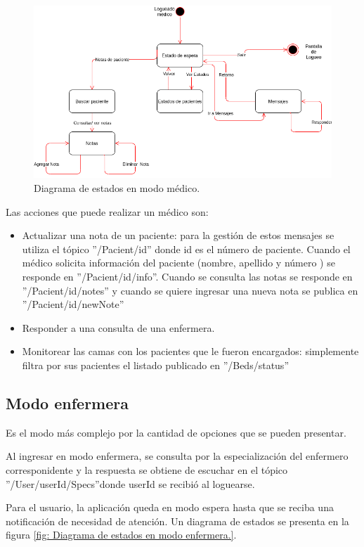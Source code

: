 \begin{figure}[ht]
	\centering
	\includegraphics[scale=.60]{./Figures/app/modo-medico.png}
	\caption{ Diagrama de estados en modo médico.}
	\label{fig: Diagrama de estados en modo médico.}
\end{figure} 

Las acciones que puede realizar un médico son:
\begin{itemize}
\item Actualizar una nota de un paciente: para la gestión de estos mensajes se utiliza el tópico ''/Pacient/id'' donde id es el número de paciente. Cuando el médico solicita información del paciente (nombre, apellido y número ) se responde  en ''/Pacient/id/info''. Cuando se consulta las notas se responde en ''/Pacient/id/notes'' y cuando se quiere ingresar una nueva nota se publica en ''/Pacient/id/newNote''
\item Responder a una consulta de una enfermera.
\item Monitorear las camas con los pacientes que le fueron encargados: simplemente filtra por sus pacientes el listado publicado en ''/Beds/status''

\end{itemize}
\pagebreak
\subsection{Modo enfermera}

Es el modo más complejo por la cantidad de opciones que se pueden presentar.

Al ingresar en modo enfermera, se consulta por la especialización del enfermero corresponidente y la respuesta se obtiene de escuchar en el tópico ''/User/userId/Specs''donde userId se recibió al loguearse.

Para el usuario, la aplicación queda en modo espera hasta que se reciba una notificación de necesidad de atención. Un diagrama de estados se presenta en la figura \ref{fig: Diagrama de estados en modo enfermera.}.

